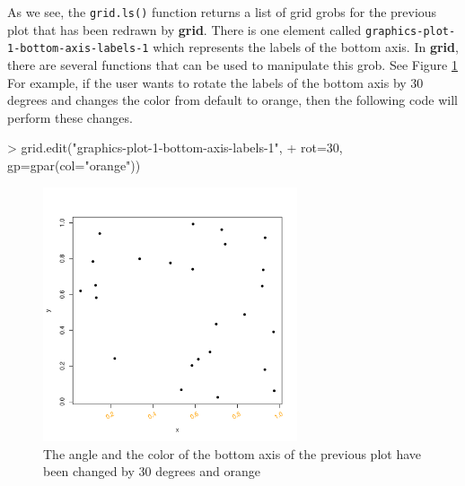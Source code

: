 \documentclass[11pt,twoside]{report}
\begin{document}
As we see, the \texttt{grid.ls()} function returns a list of grid grobs for the previous plot that has been redrawn by \textbf{grid}. There is one element called \texttt{graphics-plot-1-bottom-axis-labels-1} which represents the labels of the bottom axis. In \textbf{grid}, there are several functions that can be used to manipulate this grob. See Figure \ref{figure_1.2} \\
For example, if the user wants to rotate the labels of the bottom axis by 30 degrees and changes the color from default to orange, then the following code will perform these changes.
\begin{Schunk}
\begin{Sinput}
> grid.edit("graphics-plot-1-bottom-axis-labels-1", 
+           rot=30, gp=gpar(col="orange"))
\end{Sinput}
\end{Schunk}

\begin{figure}[h]
	\begin{center}
		\includegraphics[height = 7.5cm, width = 7.5cm]{figure/report_basic_demo_4.pdf}
		\caption{The angle and the color of the bottom axis of the previous plot have been changed by 30 degrees and orange}
		\label{figure_1.2}
	\end{center}
\end{figure}

\newpage
\end{document}
